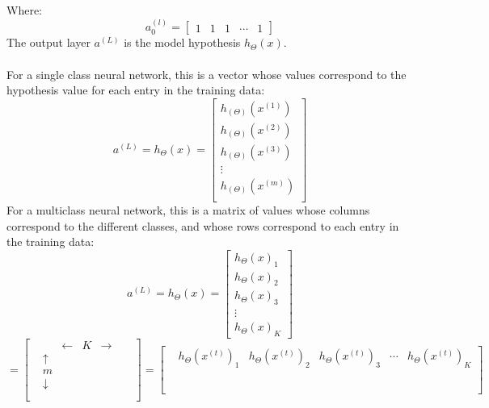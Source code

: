 \documentclass[12pt]{article}
\begin{document}
Where: \begin{equation}
a^{(l)}_0= \begin{bmatrix}
1 & 1 & 1 & \cdots & 1
\end{bmatrix}
\end{equation}
The output layer $a^{(L)}$ is the model hypothesis $h_{\Theta}(x)$.\\
\\
For a single class neural network, this is a vector whose values correspond to the hypothesis value for each entry in the training data:
\begin{equation}
a^{(L)}=h_{\Theta}(x)=\begin{bmatrix}
h_{(\Theta)}(x^{(1)})\\
h_{(\Theta)}(x^{(2)})\\
h_{(\Theta)}(x^{(3)})\\
\vdots \\
h_{(\Theta)}(x^{(m)})\\
\end{bmatrix}
\end{equation}
For a multiclass neural network, this is a matrix of values whose columns correspond to the different classes, and whose rows correspond to each entry in the training data:
\begin{equation*}
a^{(L)}=h_{\Theta}(x)=\begin{bmatrix}
h_{\Theta}(x)_1\\
h_{\Theta}(x)_2\\
h_{\Theta}(x)_3\\
\vdots \\
h_{\Theta}(x)_K
\end{bmatrix}
\end{equation*}
\begin{equation}
=\begin{bmatrix}
& & \leftarrow & K & \rightarrow & &\\
& \uparrow & & & & & \\
& m & & & & & \\
& \downarrow & & & & & \\
& & & & & & \\
\end{bmatrix}=\begin{bmatrix}
& h_{\Theta}(x^{(t)})_1 & h_{\Theta}(x^{(t)})_2 & h_{\Theta}(x^{(t)})_3 & \cdots & h_{\Theta}(x^{(t)})_K\\
& & & & & \\
& & & & & \\
& & & & & \\
& & & & & \\
\end{bmatrix}
\end{equation}
\end{document}
